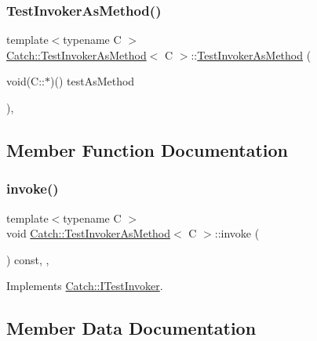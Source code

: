 \subsubsection{\texorpdfstring{TestInvokerAsMethod()}{TestInvokerAsMethod()}}
{\footnotesize\ttfamily template$<$typename C $>$ \\
\mbox{\hyperlink{class_catch_1_1_test_invoker_as_method}{Catch\+::\+Test\+Invoker\+As\+Method}}$<$ C $>$\+::\mbox{\hyperlink{class_catch_1_1_test_invoker_as_method}{Test\+Invoker\+As\+Method}} (\begin{DoxyParamCaption}\item[{void(C\+::$\ast$)()}]{test\+As\+Method }\end{DoxyParamCaption})\hspace{0.3cm}{\ttfamily [inline]}, {\ttfamily [noexcept]}}



\subsection{Member Function Documentation}
\mbox{\label{class_catch_1_1_test_invoker_as_method_a8115a06efe273f4112ec0b5452c1b5f2}} 
\subsubsection{\texorpdfstring{invoke()}{invoke()}}
{\footnotesize\ttfamily template$<$typename C $>$ \\
void \mbox{\hyperlink{class_catch_1_1_test_invoker_as_method}{Catch\+::\+Test\+Invoker\+As\+Method}}$<$ C $>$\+::invoke (\begin{DoxyParamCaption}{ }\end{DoxyParamCaption}) const\hspace{0.3cm}{\ttfamily [inline]}, {\ttfamily [override]}, {\ttfamily [virtual]}}



Implements \mbox{\hyperlink{struct_catch_1_1_i_test_invoker_a6fcd5c5b67d6d5ade6491ff33411ca7f}{Catch\+::\+I\+Test\+Invoker}}.



\subsection{Member Data Documentation}
\mbox{\label{class_catch_1_1_test_invoker_as_method_a4851e50d6b43c022c41d5de776a27ed7}} 
